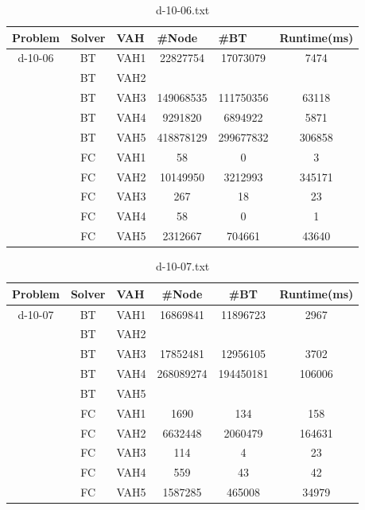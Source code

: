 \documentclass{article}
\begin{document}
\begin{table}[]
\caption{d-10-06.txt}
\begin{tabular}{|c|c|c|c|c|c|}
\hline
Problem                   & Solver & \multicolumn{1}{l|}{VAH} & \multicolumn{1}{l|}{\#Node} & \multicolumn{1}{l|}{\#BT} & \multicolumn{1}{l|}{Runtime(ms)} \\ \hline
\multirow{10}{*}{d-10-06} & BT     & VAH1                     & 22827754                    & 17073079                  & 7474                             \\ \cline{2-6} 
 & BT & VAH2 &           &           &        \\ \cline{2-6} 
 & BT & VAH3 & 149068535 & 111750356 & 63118  \\ \cline{2-6} 
 & BT & VAH4 & 9291820   & 6894922   & 5871   \\ \cline{2-6} 
 & BT & VAH5 & 418878129 & 299677832 & 306858 \\ \cline{2-6} 
 & FC & VAH1 & 58        & 0         & 3      \\ \cline{2-6} 
 & FC & VAH2 & 10149950  & 3212993   & 345171  \\ \cline{2-6} 
 & FC & VAH3 & 267       & 18        & 23     \\ \cline{2-6} 
 & FC & VAH4 & 58        & 0         & 1      \\ \cline{2-6} 
 & FC & VAH5 & 2312667   & 704661    & 43640  \\ \hline
\end{tabular}
\end{table}

\begin{table}[]
\caption{d-10-07.txt}
\label{tab:my-table}
\begin{tabular}{|c|c|c|c|c|c|}
\hline
Problem & Solver & \multicolumn{1}{l|}{VAH} & \#Node & \#BT & \multicolumn{1}{l|}{Runtime(ms)} \\ \hline
\multirow{10}{*}{d-10-07} & BT & VAH1 & 16869841 & 11896723 & 2967 \\ \cline{2-6} 
 & BT & VAH2 &  &  &  \\ \cline{2-6} 
 & BT & VAH3 & 17852481 & 12956105 & 3702 \\ \cline{2-6} 
 & BT & VAH4 & 268089274 & 194450181 & 106006 \\ \cline{2-6} 
 & BT & VAH5 &  &  &  \\ \cline{2-6} 
 & FC & VAH1 & 1690 & 134 & 158 \\ \cline{2-6} 
 & FC & VAH2 & 6632448 & 2060479 & 164631 \\ \cline{2-6} 
 & FC & VAH3 & 114 & 4 & 23 \\ \cline{2-6} 
 & FC & VAH4 & 559 & 43 & 42 \\ \cline{2-6} 
 & FC & VAH5 & 1587285 & 465008 & 34979 \\ \hline
\end{tabular}
\end{table}
\end{document}
